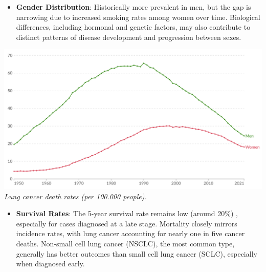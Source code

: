 \begin{itemize}
    \item \textbf{Gender Distribution}: Historically more prevalent in men, but the gap is narrowing 
    due to increased smoking rates among women over time. Biological differences, including hormonal 
    and genetic factors, may also contribute to distinct patterns of disease development and 
    progression between sexes.
\end{itemize}

\vspace{1em}
\begin{center}
    \includegraphics[width=1.00\textwidth]{../assets/01-overview/lc-death-men-vs-women.png}
    \small\textit{Lung cancer death rates (per 100.000 people). \cite{ourworldindata, who2024}}
\end{center}
\vspace{1em}

\begin{itemize}
    \item \textbf{Survival Rates}: The 5-year survival rate remains low (around 20\%) 
    \cite{nlm2025}, especially for cases diagnosed at a late stage. Mortality closely mirrors 
    incidence rates, with lung cancer accounting for nearly one in five cancer deaths. Non-small 
    cell lung cancer (NSCLC), the most common type, generally has better outcomes than small cell 
    lung cancer (SCLC), especially when diagnosed early.
\end{itemize}

